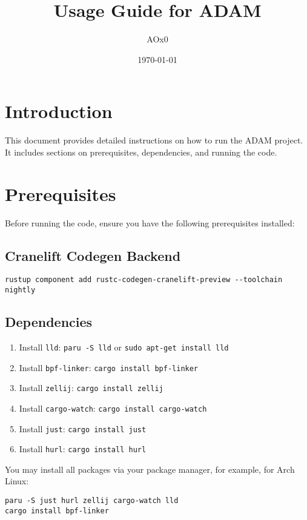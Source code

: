 \documentclass{article}
\title{Usage Guide for ADAM}
\author{AOx0}
\date{\today}
\begin{document}
\maketitle

\section{Introduction}
This document provides detailed instructions on how to run the ADAM project. It includes sections on prerequisites, dependencies, and running the code.

\section{Prerequisites}
Before running the code, ensure you have the following prerequisites installed:

\subsection{Cranelift Codegen Backend}
\begin{verbatim}
rustup component add rustc-codegen-cranelift-preview --toolchain nightly
\end{verbatim}

\subsection{Dependencies}
\begin{enumerate}
    \item Install \texttt{lld}: \texttt{paru -S lld} or \texttt{sudo apt-get install lld}
    \item Install \texttt{bpf-linker}: \texttt{cargo install bpf-linker}
    \item Install \texttt{zellij}: \texttt{cargo install zellij}
    \item Install \texttt{cargo-watch}: \texttt{cargo install cargo-watch}
    \item Install \texttt{just}: \texttt{cargo install just}
    \item Install \texttt{hurl}: \texttt{cargo install hurl}
\end{enumerate}

You may install all packages via your package manager, for example, for Arch Linux:
\begin{verbatim}
paru -S just hurl zellij cargo-watch lld
cargo install bpf-linker
\end{verbatim}
\end{document}
